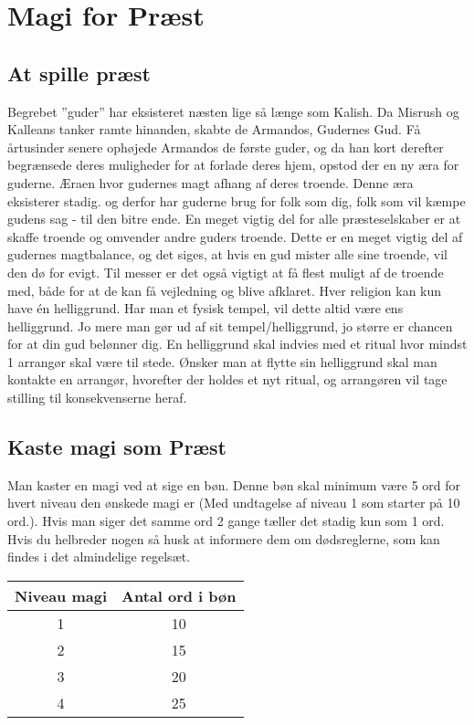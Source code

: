 \chapter{Magi for Præst}



\section{At spille præst}
Begrebet ”guder” har eksisteret næsten lige så længe som Kalish. Da Misrush og Kalleans tanker ramte hinanden, skabte de Armandos, Gudernes Gud. Få årtusinder senere ophøjede Armandos de første guder, og da han kort derefter begrænsede deres muligheder for at forlade deres hjem, opstod der en ny æra for guderne. Æraen hvor gudernes magt afhang af deres troende. Denne æra eksisterer stadig. og derfor har guderne brug for folk som dig, folk som vil kæmpe gudens sag - til den bitre ende. En meget vigtig del for alle præsteselskaber er at skaffe troende og omvender andre guders troende. Dette er en meget vigtig del af gudernes magtbalance, og det siges, at hvis en gud mister alle sine troende, vil den dø for evigt. Til messer er det også vigtigt at få flest muligt af de troende med, både for at de kan få vejledning og blive afklaret. Hver religion kan kun have én helliggrund. Har man et fysisk tempel, vil dette altid være ens helliggrund. Jo mere man gør ud af sit tempel/helliggrund, jo større er chancen for at din gud belønner dig. En helliggrund skal indvies med et ritual hvor mindst 1 arrangør skal være til stede. Ønsker man at flytte sin helliggrund skal man kontakte en arrangør, hvorefter der holdes et nyt ritual, og arrangøren vil tage stilling til konsekvenserne heraf.

\section{Kaste magi som Præst}
Man kaster en magi ved at sige en bøn. Denne bøn skal minimum være 5 ord for hvert niveau den ønskede magi er (Med undtagelse af niveau 1 som starter på 10 ord.). Hvis man siger det samme ord 2 gange tæller det stadig kun som 1 ord. Hvis du helbreder nogen så husk at informere dem om dødsreglerne, som kan findes i det almindelige regelsæt.\\
\begin{table}[H]
    \centering
    \begin{tabular}{c|c}
        Niveau magi & Antal ord i bøn \\\hline
        1 & 10\\
        2 & 15\\
        3 & 20\\
        4 & 25\\
    \end{tabular}
\end{table}

